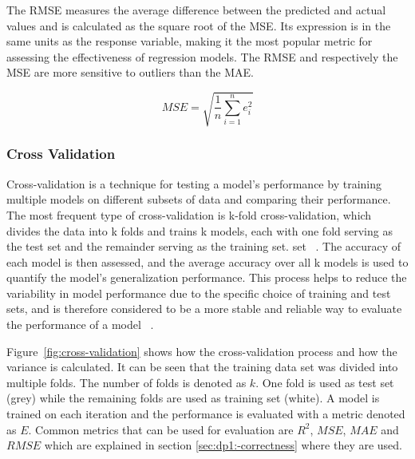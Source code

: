 The RMSE measures the average difference between the predicted and actual values and is calculated as the square root
of the MSE.
Its expression is in the same units as the response variable, making it the most popular metric for assessing the
effectiveness of regression models.
The RMSE and respectively the MSE are more sensitive to outliers than the MAE.

\begin{tcolorbox}[arc=0pt,boxrule=0.5pt]
    \begin{equation}
        \label{eq:rmse}
        MSE = \sqrt{\frac{1}{n} \sum_{i=1}^{n} e_i^2}
    \end{equation}
\end{tcolorbox}

\subsubsection{Cross Validation}\label{subsubsec:cross-validation}
Cross-validation is a technique for testing a model's performance by training multiple models on different subsets of
data and comparing their performance.
The most frequent type of cross-validation is k-fold cross-validation, which divides the data into k folds and trains
k models, each with one fold serving as the test set and the remainder serving as the training set.
set
~\cite[p. 252--260]{muller_introductionmachinelearning_2016}.
The accuracy of each model is then assessed, and the average accuracy over all k models is used to quantify the model's
generalization performance.
This process helps to reduce the variability in model performance due to the specific choice of training and test
sets, and is therefore considered to be a more stable and reliable way to evaluate the performance of a
model
~\cite[p. 252--260]{muller_introductionmachinelearning_2016}.

Figure~\ref{fig:cross-validation} shows how the cross-validation process and how the variance
is calculated.
It can be seen that the training data set was divided into multiple folds.
The number of folds is denoted as $k$.
One fold is used as test set (grey) while the remaining folds are used as training set (white).
A model is trained on each iteration and the performance is evaluated with a metric denoted as $E$.
Common metrics that can be used for evaluation are $R^2$, $MSE$, $MAE$ and $RMSE$ which are explained in section
\ref{sec:dp1:-correctness} where they are used.

